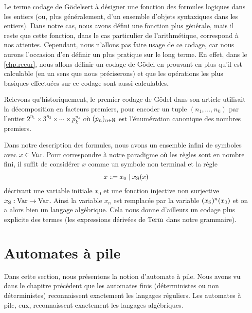 \begin{remark}
  Le terme \og codage de Gödel\fg sert à désigner une fonction des formules
  logiques dans les entiers (ou, plus généralement, d'un ensemble d'objets
  syntaxiques dans les entiers). Dans notre cas, nous avons défini une fonction
  plus générale, mais il reste que cette fonction, dans le cas particulier de
  l'arithmétique, correspond à nos attentes. Cependant, nous n'allons pas
  faire usage de ce codage, car nous aurons l'occasion d'en définir un plus
  pratique sur le long terme. En effet, dans le \cref{chp.recur}, nous allons
  définir un codage de Gödel en prouvant en plus qu'il est calculable (en un
  sens que nous préciserons) et que les opérations les plus basiques effectuées
  sur ce codage sont aussi calculables.

  Relevons qu'historiquement, le premier codage de Gödel dans son article
  \cite{Goedel1931} utilisait la décomposition en facteurs premiers, pour
  encoder un tuple $(n_1,\ldots,n_k)$ par l'entier
  $2^{n_1}\times 3^{n_2}\times\cdots \times p_k^{n_k}$ où $(p_n)_{n \in \mathbb N}$
  est l'énumération canonique des nombres premiers.
\end{remark}

\begin{remark}
  Dans notre description des formules, nous avons un ensemble infini de
  symboles avec $x \in \operatorname{Var}$. Pour correspondre à notre paradigme où les
  règles sont en nombre fini, il suffit de considérer $x$ comme un symbole non
  terminal et la règle
  \[x \inddefeq x_0\mid x_{\Ss}(x)\]
  décrivant une variable initiale $x_0$ et une fonction injective non surjective
  $x_{\operatorname{S}} : \operatorname{Var} \to \operatorname{Var}$. Ainsi la variable $x_n$ est remplacée par la
  variable $(x_{\operatorname{S}})^n(x_0)$ et on a alors bien un langage algébrique. Cela
  nous donne d'ailleurs un codage plus explicite des termes (les expressions
  dérivées de $\operatorname{Term}$ dans notre grammaire).
\end{remark}

\section{Automates à pile}

Dans cette section, nous présentons la notion d'automate à pile. Nous avons vu
dans le chapitre précédent que les automates finis (déterministes ou non
déterministes) reconnaissent exactement les langages réguliers. Les automates à
pile, eux, reconnaissent exactement les langages algébriques.

